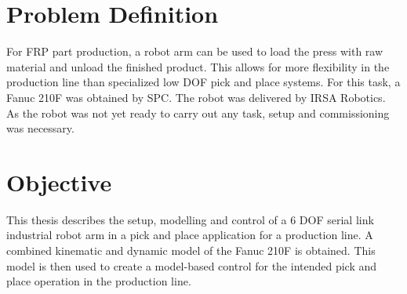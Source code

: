 \section{Problem Definition}

For \ac{FRP} part production, a robot arm can be used to load the press with raw material and unload the finished product. This allows for more flexibility in the production line than specialized low \ac{DOF} pick and place systems.
For this task, a Fanuc 210F was obtained by \ac{SPC}. The robot was delivered by IRSA Robotics. As the robot was not yet ready to carry out any task, setup and commissioning was necessary. 

\medskip

\section{Objective}

This thesis describes the setup, modelling and control of a 6 \ac{DOF} serial link industrial robot arm in a pick and place application for a production line. A combined kinematic and dynamic model of the Fanuc 210F is obtained. This model is then used to create a model-based control for the intended pick and place operation in the production line.

